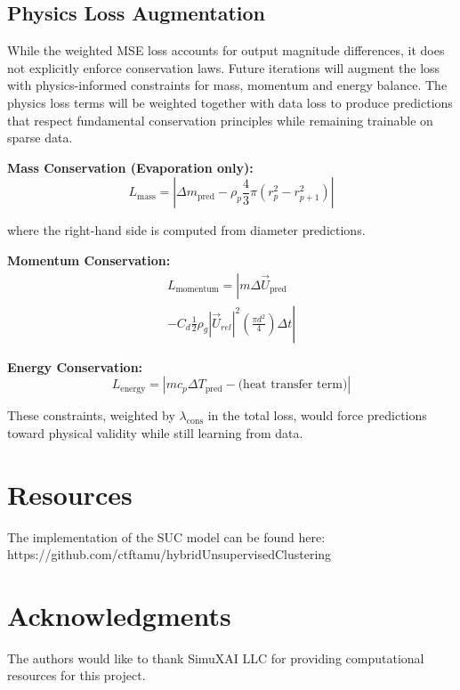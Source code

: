 \documentclass[letterpaper,twocolumn,10pt]{article}
\begin{document}
\subsection{Physics Loss Augmentation}

While the weighted MSE loss accounts for output magnitude differences, it does not explicitly enforce conservation laws. Future iterations will augment the loss with physics-informed constraints for mass, momentum and energy balance.
The physics loss terms will be weighted together with data loss to produce predictions that respect fundamental conservation principles while remaining trainable on sparse data.


\textbf{Mass Conservation (Evaporation only):}
\begin{equation}
L_{\text{mass}} = \left| \Delta m_{\text{pred}} - \rho_p \frac{4}{3}\pi (r_p^2 - r_{p+1}^2) \right|
\end{equation}

where the right-hand side is computed from diameter predictions.

\textbf{Momentum Conservation:}
\begin{multline*}
L_{\text{momentum}} = \left| m \Delta \vec{U}_{\text{pred}} \right. \\
\left. - C_d \frac{1}{2} \rho_g |\vec{U}_{rel}|^2 \left(\frac{\pi d^2}{4}\right) \Delta t \right|
\end{multline*}

\textbf{Energy Conservation:}
\begin{equation}
L_{\text{energy}} = \left| m c_p \Delta T_{\text{pred}} - \text{(heat transfer term)} \right|
\end{equation}

These constraints, weighted by $\lambda_{\text{cons}}$ in the total loss, would force predictions toward physical validity while still learning from data.


\section{Resources}
The implementation of the SUC model can be found here: https://github.com/ctftamu/hybridUnsupervisedClustering

\section*{Acknowledgments}

The authors would like to thank SimuXAI LLC for providing computational resources for this project.
\end{document}
